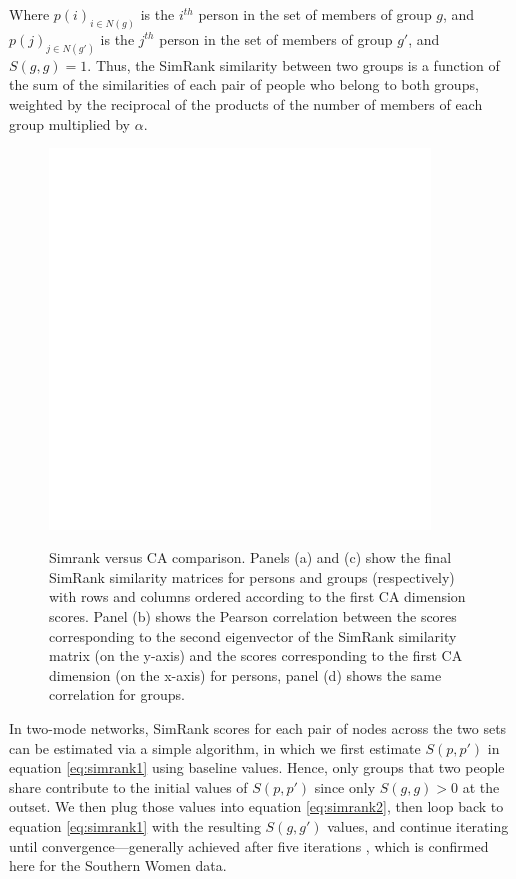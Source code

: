 \documentclass[a4paper,fleqn]{cas-sc}
\begin{document}
Where $p(i)_{i \in N(g)}$ is the $i^{th}$ person in the set of members of group $g$, and $p(j)_{j \in N(g')}$ is the $j^{th}$ person in the set of members of group $g'$, and $S(g, g) = 1$. Thus, the SimRank similarity between two groups is a function of the sum of the similarities of each pair of people who belong to both groups, weighted by the reciprocal of the products of the number of members of each group multiplied by $\alpha$.

\begin{figure}
    \captionsetup[subfigure]{font=footnotesize,labelfont=footnotesize}
    \centering
        \includegraphics[width=0.9\textwidth]{Plots/simrank-v-ca.png}
            \label{fig:sim-v-ca}
    \caption{Simrank versus CA comparison. Panels (a) and (c) show the final SimRank similarity matrices for persons and groups (respectively) with rows and columns ordered according to the first CA dimension scores.  Panel (b) shows the Pearson correlation between the scores corresponding to the second eigenvector of the SimRank similarity matrix (on the y-axis) and the scores corresponding to the first CA dimension (on the x-axis) for persons, panel (d) shows the same correlation for groups.}
    \label{fig:simrank}
\end{figure}

In two-mode networks, SimRank scores for each pair of nodes across the two sets can be estimated via a simple algorithm, in which we first estimate $S(p, p')$ in equation \ref{eq:simrank1} using baseline values. Hence, only groups that two people share contribute to the initial values of $S(p, p')$ since only $S(g, g)>0$ at the outset. We then plug those values into equation \ref{eq:simrank2}, then loop back to equation \ref{eq:simrank1} with the resulting $S(g, g')$ values, and continue iterating until convergence---generally achieved after five iterations \citep{jeh2002simrank}, which is confirmed here for the Southern Women data. 
\end{document}
